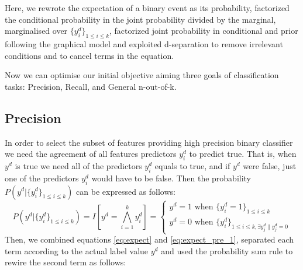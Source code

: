 \documentclass[11pt,a4paper]{article}
\begin{document}
Here, we rewrote the expectation of a binary event as its probability, factorized the conditional probability in the joint probability divided by the marginal, marginalised over $\{y^d_i\}_{1\leq i\leq k}$, factorized joint probability in conditional and prior following the graphical model and exploited d-separation to remove irrelevant conditions and to cancel terms in the equation.

Now we can optimise our initial objective aiming three goals of classification tasks: Precision, Recall, and General n-out-of-k.

\subsection{Precision}
In order to select the subset of features providing high precision binary classifier we need the agreement of all features predictors $y^d_i$ to predict true. That is, when $y^d$ is true we need all of the predictors $y^d_i$ equals to true, and if $y^d$ were false, just one of the predictors $y^d_i$ would have to be false. Then the probability $P\left(y^d|\{y^d_i\}_{1\leq i\leq k}\right)$ can be expressed as follows:
\begin{equation}
P\left(y^d|\{y^d_i\}_{1\leq i\leq k}\right)=I\left[y^d=\bigwedge_{i=1}^k y^d_i\right]=
\begin{cases}
	y^d=1 \text{ when } \{y_i^d=1\}_{1\leq i\leq k}\\
	y^d=0 \text{ when } \{y_i^d\}_{1\leq i\leq k,\exists{y_j^d\|y_j^d=0}}
\end{cases}\label{eq:expect_pre_1}
\end{equation}
Then, we combined equations \eqref{eq:expect} and \eqref{eq:expect_pre_1}, separated each term according to the actual label value $y^d$ and used the probability sum rule to rewire the second term as follows:
\end{document}
